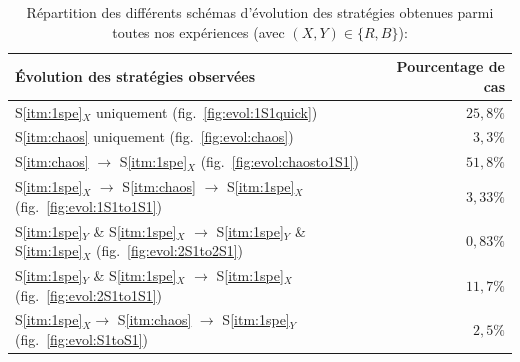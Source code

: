 \documentclass[a4paper,10pt]{report}
\begin{document}


\begin{table}[H]
	\centering
	\caption[Fréquences des schémas évolutionnaires]{Répartition des différents schémas d'évolution des stratégies obtenues parmi toutes nos expériences (avec $(X,Y)\in\{R,B\}$):}
	\label{tab:res:strat}
	
	\begin{tabular}{lr} 
	\textbf{\'{E}volution des stratégies observées} & \textbf{Pourcentage de cas} \\ \hline
	S\ref{itm:1spe}$_X$ uniquement 		(fig.~\ref{fig:evol:1S1quick})	& $25,8\%$\\
	S\ref{itm:chaos} uniquement 		(fig.~\ref{fig:evol:chaos})				& $3,3\%$ \\
	S\ref{itm:chaos} $\rightarrow$  S\ref{itm:1spe}$_X$ 		(fig.~\ref{fig:evol:chaosto1S1})	 	& $51,8\%$\\
	S\ref{itm:1spe}$_X$ $\rightarrow$ S\ref{itm:chaos} $\rightarrow$  S\ref{itm:1spe}$_X$ 		(fig.~\ref{fig:evol:1S1to1S1})	& $3,33\%$\\
	S\ref{itm:1spe}$_Y$ \& S\ref{itm:1spe}$_X$  $\rightarrow$ S\ref{itm:1spe}$_Y$ \& S\ref{itm:1spe}$_X$ (fig.~\ref{fig:evol:2S1to2S1})	& $0,83\%$ \\
	S\ref{itm:1spe}$_Y$ \& S\ref{itm:1spe}$_X$  $\rightarrow$ S\ref{itm:1spe}$_X$ 	(fig.~\ref{fig:evol:2S1to1S1}) 	& $11,7\%$ \\
	S\ref{itm:1spe}$_X \rightarrow$ S\ref{itm:chaos} $\rightarrow$ S\ref{itm:1spe}$_Y$ 	(fig.~\ref{fig:evol:S1toS1})		& $2,5\%$\\
	\end{tabular}
	
	\end{table}
	
\end{document}

